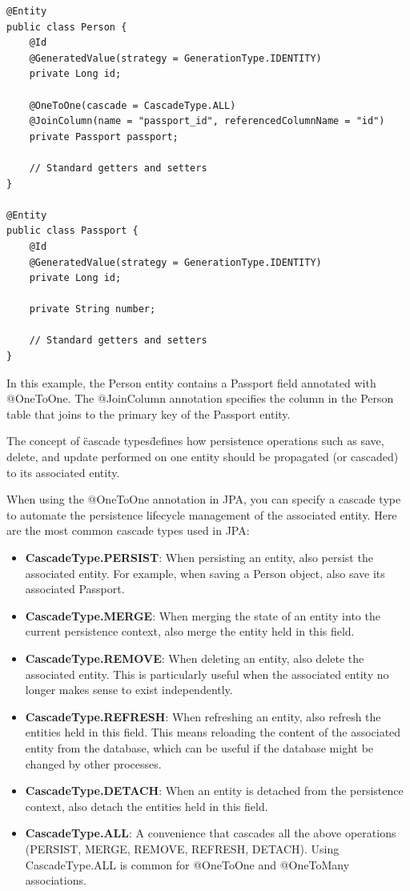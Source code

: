 \begin{lstlisting}
@Entity
public class Person {
    @Id
    @GeneratedValue(strategy = GenerationType.IDENTITY)
    private Long id;
    
    @OneToOne(cascade = CascadeType.ALL)
    @JoinColumn(name = "passport_id", referencedColumnName = "id")
    private Passport passport;

    // Standard getters and setters
}

@Entity
public class Passport {
    @Id
    @GeneratedValue(strategy = GenerationType.IDENTITY)
    private Long id;
    
    private String number;

    // Standard getters and setters
}
\end{lstlisting}

In this example, the Person entity contains a Passport field annotated with @OneToOne. The @JoinColumn annotation specifies the column in the Person table that joins to the primary key of the Passport entity.

The concept of \"cascade types\" defines how persistence operations such as save, delete, and update performed on one entity should be propagated (or cascaded) to its associated entity. 

When using the @OneToOne annotation in JPA, you can specify a cascade type to automate the persistence lifecycle management of the associated entity. Here are the most common cascade types used in JPA:

\begin{itemize}
\item \textbf{CascadeType.PERSIST}: When persisting an entity, also persist the associated entity.  For example, when saving a Person object, also save its associated Passport.

\item \textbf{CascadeType.MERGE}: When merging the state of an entity into the current persistence context, also merge the entity held in this field.

\item \textbf{CascadeType.REMOVE}: When deleting an entity, also delete the associated entity. This is particularly useful when the associated entity no longer makes sense to exist independently.

\item \textbf{CascadeType.REFRESH}: When refreshing an entity, also refresh the entities held in this field. This means reloading the content of the associated entity from the database, which can be useful if the database might be changed by other processes.

\item \textbf{CascadeType.DETACH}: When an entity is detached from the persistence context, also detach the entities held in this field.

\item \textbf{CascadeType.ALL}: A convenience that cascades all the above operations (PERSIST, MERGE, REMOVE, REFRESH, DETACH). Using CascadeType.ALL is common for @OneToOne and @OneToMany associations.
\end{itemize}

